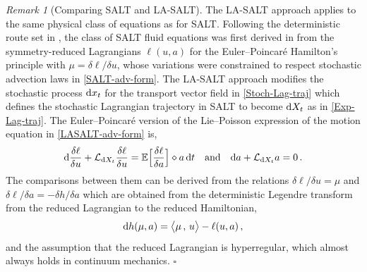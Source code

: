 \documentclass[11pt, oneside]{article}   	%
\numberwithin{equation}{section}
\theoremstyle{plain}
\theoremstyle{definition}
\theoremstyle{remark}
\newtheorem{remark}[theorem]{Remark}
\newcommand{\<}{\langle}
\renewcommand{\>}{\rangle}
\def\diff{\textnormal{d}}
\newcommand{\scp}[2]{{\big\langle {#1}\, , \, {#2}\big\rangle}}
\begin{document}
\begin{remark}[Comparing SALT and LA-SALT]\rm
The LA-SALT approach applies to the same physical class of equations as for SALT. Following the deterministic route set in \cite{HMR1998}, the class of SALT fluid equations was first derived in \cite{Holm2015} from the symmetry-reduced Lagrangians $\ell(u,a)$ for the Euler--Poincar\'e Hamilton's principle with $\mu=\delta \ell/\delta u$, whose variations were constrained to respect stochastic advection laws in \eqref{SALT-adv-form}. The LA-SALT approach modifies the stochastic process $ \diff{x_t}$ for the transport vector field in \eqref{Stoch-Lag-traj} which defines the stochastic Lagrangian trajectory in SALT to become $ \diff{X_t}$ as in \eqref{Exp-Lag-traj}. The Euler--Poincar\'e version of the Lie--Poisson expression of the motion equation in \eqref{LASALT-adv-form} is, 
\begin{align}\label{LASALT-EP}
 \diff{\frac{\delta \ell}{\delta u}} + \mathcal{L}_{ \diff{X_t}} \frac{\delta \ell}{\delta u}  
 = \mathbb{E}\Big[ \frac{\delta \ell}{\delta a}\Big] \diamond a\,\diff t
 \quad\hbox{and}\quad
  {\rm d}a + \mathcal{L}_{ {\rm d}X_t} a = 0
\,.
\end{align}
The comparisons between them can be derived from the relations ${\delta \ell}/{\delta u}=\mu$ and ${\delta \ell}/{\delta a}=-{\delta h}/{\delta a}$ which are obtained from the deterministic Legendre transform from the reduced Lagrangian to the reduced Hamiltonian,
\begin{align}
\diff h(\mu,a) = \scp{\mu}{u} - \ell(u,a)
\,,
\label{Legendre-xform}
\end{align}
and the assumption that the reduced Lagrangian is hyperregular, which almost always holds in continuum mechanics. \hfill $\square$
\end{remark}
\end{document}
